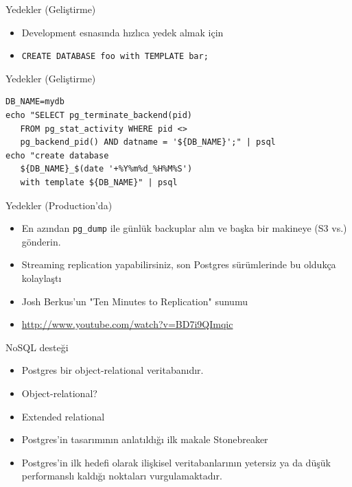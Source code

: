 \documentclass[presentation]{beamer}
\begin{document}
\begin{frame}[fragile,label=sec-17]{Yedekler (Geliştirme)}
 \begin{itemize}
\item Development esnasında hızlıca yedek almak için

\item \texttt{CREATE DATABASE foo with TEMPLATE bar;}
\end{itemize}
\end{frame}

\begin{frame}[fragile,label=sec-18]{Yedekler (Geliştirme)}
 \begin{verbatim}
DB_NAME=mydb
echo "SELECT pg_terminate_backend(pid)
   FROM pg_stat_activity WHERE pid <>
   pg_backend_pid() AND datname = '${DB_NAME}';" | psql
echo "create database
   ${DB_NAME}_$(date '+%Y%m%d_%H%M%S')
   with template ${DB_NAME}" | psql
\end{verbatim}
\end{frame}

\begin{frame}[fragile,label=sec-19]{Yedekler (Production'da)}
 \begin{itemize}
\item En azından \texttt{pg\_dump} ile günlük backuplar alın ve başka bir makineye (S3 vs.) gönderin.
\item Streaming replication yapabilirsiniz, son Postgres sürümlerinde bu oldukça
kolaylaştı
\item Josh Berkus'un "Ten Minutes to Replication" sunumu
\item \url{http://www.youtube.com/watch?v=BD7i9QImqic}
\end{itemize}
\end{frame}


\begin{frame}[label=sec-20]{NoSQL desteği}
\begin{itemize}
\item Postgres bir object-relational veritabanıdır.
\item Object-relational?
\item Extended relational
\item Postgres'in tasarımının anlatıldığı ilk makale Stonebreaker
\item Postgres'in ilk hedefi olarak ilişkisel veritabanlarının yetersiz ya da düşük
performanslı kaldığı noktaları vurgulamaktadır.
\end{itemize}
\end{frame}
\end{document}
